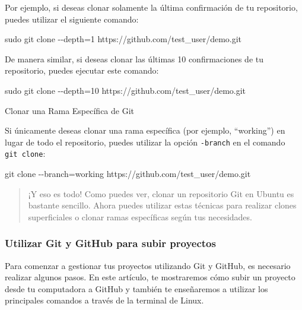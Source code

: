 \documentclass[
  letterpaper,
  DIV=11,
  numbers=noendperiod]{scrartcl}
\newenvironment{Shaded}{}{}
\newcommand{\AttributeTok}[1]{\textcolor[rgb]{0.84,0.23,0.29}{#1}}
\newcommand{\FunctionTok}[1]{\textcolor[rgb]{0.44,0.26,0.76}{#1}}
\newcommand{\NormalTok}[1]{\textcolor[rgb]{0.14,0.16,0.18}{#1}}
\newcommand{\OperatorTok}[1]{\textcolor[rgb]{0.14,0.16,0.18}{#1}}
\begin{document}
Por ejemplo, si deseas clonar solamente la última confirmación de tu
repositorio, puedes utilizar el siguiente comando:

\begin{Shaded}
\begin{Highlighting}[]
\FunctionTok{sudo}\NormalTok{ git clone }\AttributeTok{{-}{-}depth}\OperatorTok{=}\NormalTok{1 https://github.com/test\_user/demo.git}
\end{Highlighting}
\end{Shaded}

De manera similar, si deseas clonar las últimas 10 confirmaciones de tu
repositorio, puedes ejecutar este comando:

\begin{Shaded}
\begin{Highlighting}[]
\FunctionTok{sudo}\NormalTok{ git clone }\AttributeTok{{-}{-}depth}\OperatorTok{=}\NormalTok{10 https://github.com/test\_user/demo.git}
\end{Highlighting}
\end{Shaded}

Clonar una Rama Específica de Git

Si únicamente deseas clonar una rama específica (por ejemplo,
``working'') en lugar de todo el repositorio, puedes utilizar la opción
\texttt{-branch} en el comando \texttt{git\ clone}:

\begin{Shaded}
\begin{Highlighting}[]
\FunctionTok{git}\NormalTok{ clone }\AttributeTok{{-}{-}branch}\OperatorTok{=}\NormalTok{working https://github.com/test\_user/demo.git}
\end{Highlighting}
\end{Shaded}

\begin{quote}
¡Y eso es todo! Como puedes ver, clonar un repositorio Git en Ubuntu es
bastante sencillo. Ahora puedes utilizar estas técnicas para realizar
clones superficiales o clonar ramas específicas según tus necesidades.
\end{quote}

\hypertarget{utilizar-git-y-github-para-subir-proyectos}{%
\subsubsection{Utilizar Git y GitHub para subir
proyectos}\label{utilizar-git-y-github-para-subir-proyectos}}

Para comenzar a gestionar tus proyectos utilizando Git y GitHub, es
necesario realizar algunos pasos. En este artículo, te mostraremos cómo
subir un proyecto desde tu computadora a GitHub y también te enseñaremos
a utilizar los principales comandos a través de la terminal de Linux.
\end{document}
